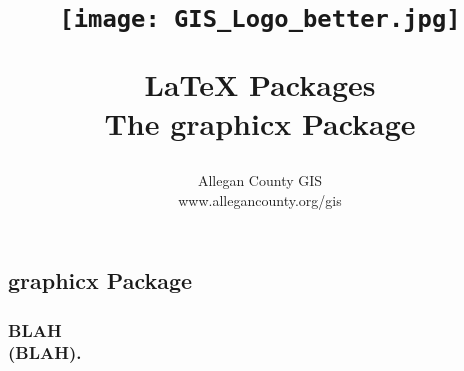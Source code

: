 \documentclass[class=book , crop=false]{standalone}
\title{ %
\HRule %
\\[.4cm] %
\begin{figure}[H] %
\begin{center}	%
\texttt{[image: GIS\_Logo\_better.jpg]}
\end{center}
\end{figure}
\Huge \bfseries \LaTeX{} Packages\\ \medskip\large The graphicx Package %
\HRule \\[.4cm] %
}  %
\author{\Large Allegan County GIS \\\Large www.allegancounty.org/gis} %
\begin{document}

\ifstandalone
\maketitle %
\tableofcontents %
\clearpage
\fi

\subsection{graphicx Package}
\medskip
\subsubsection{\Large BLAH \\\small(BLAH).}
\end{document}
